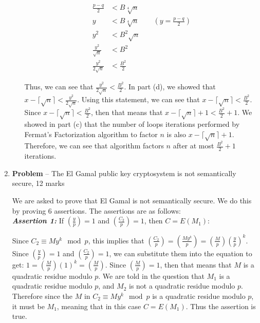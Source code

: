 \documentclass[11pt]{article}
\theoremstyle{definition}
\newcounter{problem}
\providecommand{\Leg}[2]{\genfrac{(}{)}{}{}{#1}{#2}}
\begin{document}
\begin{enumerate}
\begin{enumerate}
\begin{align*}
    \frac{p - q}{2} &< B\sqrt[4]{n} \\
    y &< B\sqrt[4]{n} \quad \quad (y = \frac{p - q}{2}) \\
    y^2 &< B^2\sqrt{n} \\
    \frac{y^2}{\sqrt{n}} &< B^2 \\
    \frac{y^2}{2\sqrt{n}} &< \frac{B^2}{2}
\end{align*}

Thus, we can see that $\frac{y^2}{2\sqrt{n}} < \frac{B^2}{2}$. In part (d), we showed that $x - \lceil \sqrt{n} \rceil < \frac{y^2}{2\sqrt{n}}$. Using this statement, we can see that $x - \lceil \sqrt{n} \rceil < \frac{B^2}{2}$. Since $x - \lceil \sqrt{n} \rceil < \frac{B^2}{2}$, then that means that $x - \lceil \sqrt{n} \rceil + 1 < \frac{B^2}{2} + 1$. We showed in part (c) that the number of loops iterations performed by Fermat's Factorization algorithm to factor $n$ is also $x - \lceil \sqrt{n} \rceil + 1$. Therefore, we can see that algorithm factors $n$ after at most $\frac{B^2}{2} + 1$ iterations. 

\end{enumerate}

\newpage

\item[] \textbf{Problem \theproblem} -- The El Gamal public key cryptosystem is not
    semantically secure, 12 marks

We are asked to prove that El Gamal is not semantically secure. We do this by proving 6 assertions. The assertions are as follows: \\

\textbf{\textit{Assertion 1:}} If $\Leg{y}{p} = 1$ and $\Leg{C_2}{p} = 1$, then $C = E(M_1)$:

Since $C_2 \equiv My^k \mod{p}$, this implies that $\Leg{C_2}{p} = \Leg{My^k}{p} = \Leg{M}{p} \Leg{y}{p}^k$. Since $\Leg{y}{p} = 1$ and $\Leg{C_2}{p} = 1$, we can substitute them into the equation to get: $1 = \Leg{M}{p} (1)^k = \Leg{M}{p}$. Since $\Leg{M}{p} = 1$, then that means that $M$ is a quadratic residue modulo $p$. We are told in the question that $M_1$ is a quadratic residue modulo $p$, and $M_2$ is not a quadratic residue modulo $p$. Therefore since the $M$ in $C_2 \equiv My^k \mod{p}$ is a quadratic residue modulo $p$, it must be $M_1$, meaning that in this case $C = E(M_1)$. Thus the assertion is true. \\ \\



\end{enumerate}
\end{document}
